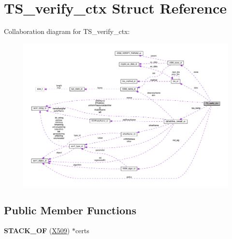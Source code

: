 \hypertarget{structTS__verify__ctx}{}\section{T\+S\+\_\+verify\+\_\+ctx Struct Reference}
\label{structTS__verify__ctx}


Collaboration diagram for T\+S\+\_\+verify\+\_\+ctx\+:
\nopagebreak
\begin{figure}[H]
\begin{center}
\leavevmode
\includegraphics[width=350pt]{structTS__verify__ctx__coll__graph}
\end{center}
\end{figure}
\subsection*{Public Member Functions}
\begin{DoxyCompactItemize}
\item 
\mbox{\label{structTS__verify__ctx_a27ea1de4a3594f27c7ac6255091f858f}} 
{\bfseries S\+T\+A\+C\+K\+\_\+\+OF} (\hyperlink{structx509__st}{X509}) $\ast$certs
\end{DoxyCompactItemize}
